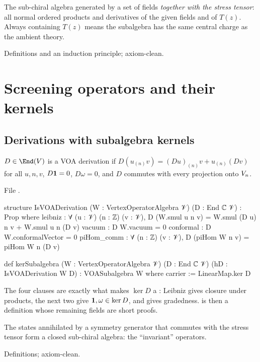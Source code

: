 \begin{physics}
The sub-chiral algebra generated by a set of fields \emph{together with the stress tensor}: all normal
ordered products and derivatives of the given fields and of $T(z)$. Always containing $T(z)$ means
the subalgebra has the same central charge as the ambient theory.
\end{physics}
\begin{status}
Definitions and an induction principle; axiom-clean.
\end{status}

\section{Screening operators and their kernels}\label{l04:sec:screening}

\subsection{Derivations with subalgebra kernels}

\begin{definition}\label{l04:def:voader}
$D\in\End(\lfourV)$ is a VOA derivation if $D(u_{(n)}v) = (Du)_{(n)}v + u_{(n)}(Dv)$ for all $u,n,v$,
$D\mathbf{1} = 0$, $D\omega = 0$, and $D$ commutes with every projection onto $V_n$.
\end{definition}
\noindent File .
\begin{leancode}
structure IsVOADerivation (W : VertexOperatorAlgebra 𝒱) (D : End ℂ 𝒱) : Prop where
  leibniz : ∀ (u : 𝒱) (n : ℤ) (v : 𝒱),
      D (W.smul u n v) = W.smul (D u) n v + W.smul u n (D v)
  vacuum : D W.vacuum = 0
  conformal : D W.conformalVector = 0
  piHom_comm : ∀ (n : ℤ) (v : 𝒱), D (piHom W n v) = piHom W n (D v)

def kerSubalgebra (W : VertexOperatorAlgebra 𝒱) (D : End ℂ 𝒱)
    (hD : IsVOADerivation W D) : VOASubalgebra W where
  carrier := LinearMap.ker D
\end{leancode}
\begin{dictionary}
The four clauses are exactly what makes $\ker D$ a : Leibniz gives closure
under products, the next two give $\mathbf{1},\omega\in\ker D$, and  gives gradedness.
 is then a definition whose remaining fields are short proofs.
\end{dictionary}
\begin{physics}
The states annihilated by a symmetry generator that commutes with the stress tensor form a closed
sub-chiral algebra: the ``invariant'' operators.
\end{physics}
\begin{status}
Definitions; axiom-clean.
\end{status}

